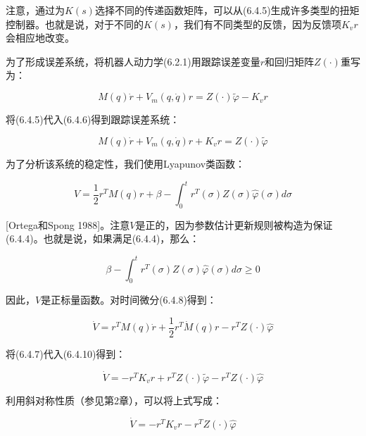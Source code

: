 \documentclass[12pt,a4paper]{ctexart}
\begin{document}
注意，通过为$K(s)$选择不同的传递函数矩阵，可以从(6.4.5)生成许多类型的扭矩控制器。也就是说，对于不同的$K(s)$，我们有不同类型的反馈，因为反馈项$K_v r$会相应地改变。

为了形成误差系统，将机器人动力学(6.2.1)用跟踪误差变量$r$和回归矩阵$Z(\cdot)$重写为：

\begin{equation}\label{eq:error-passivity}
M(q)\dot{r} + V_m(q, \dot{q})r = Z(\cdot)\tilde{\varphi} - K_v r
\end{equation}

将(6.4.5)代入(6.4.6)得到跟踪误差系统：

\begin{equation}\label{eq:tracking-error-passivity}
M(q)\dot{r} + V_m(q, \dot{q})r + K_v r = Z(\cdot)\tilde{\varphi}
\end{equation}

为了分析该系统的稳定性，我们使用Lyapunov类函数：

\begin{equation}\label{eq:lyapunov-passivity}
V = \frac{1}{2}r^T M(q) r + \beta - \int_0^t r^T(\sigma)Z(\sigma)\hat{\varphi}(\sigma)d\sigma
\end{equation}

[Ortega和Spong 1988]。注意$V$是正的，因为参数估计更新规则被构造为保证(6.4.4)。也就是说，如果满足(6.4.4)，那么：

\begin{equation}
\beta - \int_0^t r^T(\sigma)Z(\sigma)\hat{\varphi}(\sigma)d\sigma \geq 0
\end{equation}

因此，$V$是正标量函数。对时间微分(6.4.8)得到：

\begin{equation}\label{eq:v-deriv-passivity}
\dot{V} = r^T M(q)\dot{r} + \frac{1}{2}r^T \dot{M}(q)r - r^T Z(\cdot)\hat{\varphi}
\end{equation}

将(6.4.7)代入(6.4.10)得到：

\begin{equation}\label{eq:v-subst-passivity}
\dot{V} = -r^T K_v r + r^T Z(\cdot)\tilde{\varphi} - r^T Z(\cdot)\hat{\varphi}
\end{equation}

利用斜对称性质（参见第2章），可以将上式写成：

\begin{equation}\label{eq:v-skew-passivity}
\dot{V} = -r^T K_v r - r^T Z(\cdot)\hat{\varphi}
\end{equation}
\end{document}
